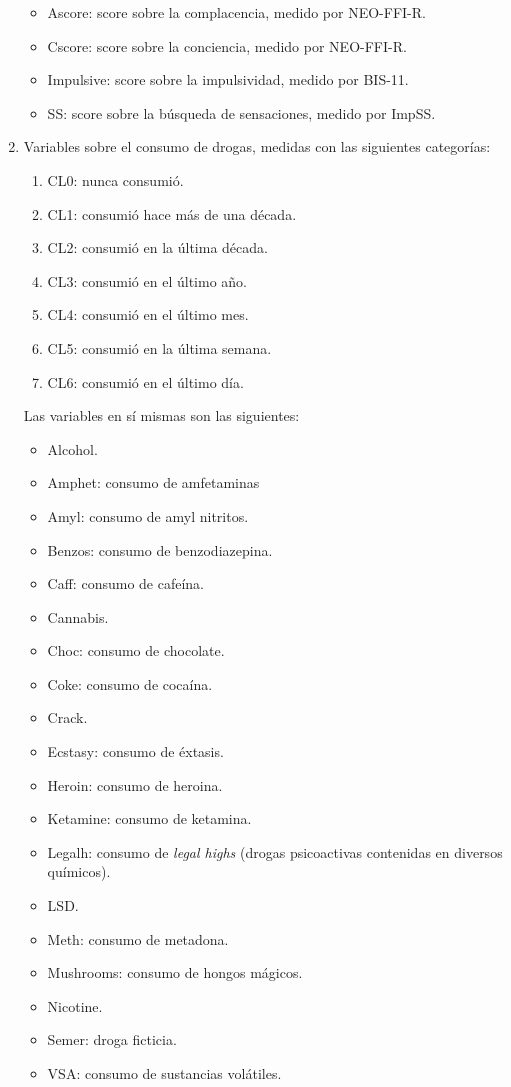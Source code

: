 \documentclass[a4paper,twocolumn]{article}
\begin{document}
\begin{enumerate}[label=\roman*)]
\begin{itemize}
		\item Ascore: score sobre la complacencia, medido por \mbox{NEO-FFI-R}.
		\item Cscore: score sobre la conciencia, medido por \mbox{NEO-FFI-R}.
		\item Impulsive: score sobre la impulsividad, medido por \mbox{BIS-11}.
		\item SS: score sobre la búsqueda de sensaciones, medido por \mbox{ImpSS}.
	\end{itemize}
	\item Variables sobre el consumo de drogas, medidas con las siguientes categorías:
	\begin{enumerate}[label=\arabic*)]
		\item CL0: nunca consumió.
		\item CL1: consumió hace más de una década.
		\item CL2: consumió en la última década.
		\item CL3: consumió en el último año.
		\item CL4: consumió en el último mes.
		\item CL5: consumió en la última semana.
		\item CL6: consumió en el último día.
	\end{enumerate}
	Las variables en sí mismas son las siguientes:
	\begin{itemize}%
		\item Alcohol.
		\item Amphet: consumo de amfetaminas
		\item Amyl: consumo de amyl nitritos.
		\item Benzos: consumo de benzodiazepina.
		\item Caff: consumo de cafeína.
		\item Cannabis.
		\item Choc: consumo de chocolate.
		\item Coke: consumo de cocaína.
		\item Crack.
		\item Ecstasy: consumo de éxtasis.
		\item Heroin: consumo de heroina.
		\item Ketamine: consumo de ketamina.
		\item Legalh: consumo de \emph{legal highs} (drogas psicoactivas contenidas en diversos químicos).
		\item LSD.
		\item Meth: consumo de metadona.
		\item Mushrooms: consumo de hongos mágicos.
		\item Nicotine.
		\item Semer: droga ficticia.
		\item VSA: consumo de sustancias volátiles.
	\end{itemize}
\end{enumerate} 
\end{document}
